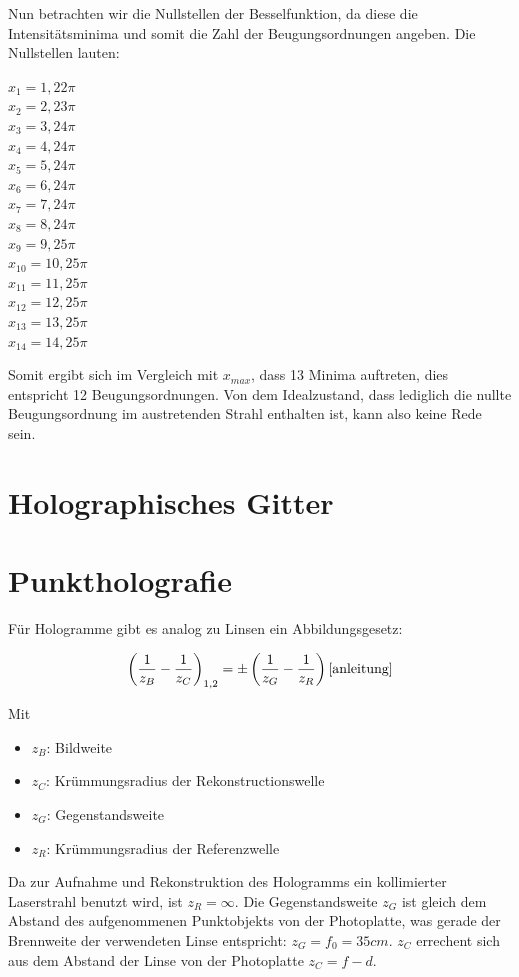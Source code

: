 \documentclass[bigchapter,colorback,accentcolor=tud4b,linedtoc,11pt]{tudreport}
\begin{document}
Nun betrachten wir die Nullstellen der Besselfunktion, da diese die Intensitätsminima und somit die Zahl der Beugungsordnungen angeben. Die Nullstellen lauten: 

\begin{center}
$x_1 = 1,22 \pi$ \\
$x_2 = 2,23 \pi$ \\
$x_3 = 3,24 \pi$ \\
$x_4 = 4,24 \pi$ \\
$x_5 = 5,24 \pi$ \\
$x_6 = 6,24 \pi$ \\
$x_7 = 7,24 \pi$ \\
$x_8 = 8,24 \pi$ \\
$x_9 = 9,25 \pi$ \\
$x_{10} = 10,25 \pi$ \\
$x_{11} = 11,25 \pi$ \\
$x_{12} = 12,25 \pi$ \\
$x_{13} = 13,25 \pi$ \\
$x_{14} = 14,25 \pi$
\end{center}

Somit ergibt sich im Vergleich mit $x_{max}$, dass 13 Minima auftreten, dies entspricht 12 Beugungsordnungen. Von dem Idealzustand, dass lediglich die nullte Beugungsordnung im austretenden Strahl enthalten ist, kann also keine Rede sein.

\section{Holographisches Gitter}

\section{Punktholografie}

Für Hologramme gibt es analog zu Linsen ein Abbildungsgesetz:

$$\left( \frac{1}{z_B} -\frac{1}{z_C} \right)_{1,2} = \pm \left( \frac{1}{z_G}
  -\frac{1}{z_R} \right) \cite{anleitung}$$

Mit 
\begin{itemize}
  \item $z_B$: Bildweite
  \item $z_C$: Krümmungsradius der Rekonstructionswelle
  \item $z_G$: Gegenstandsweite
  \item $z_R$: Krümmungsradius der Referenzwelle
\end{itemize}
Da zur Aufnahme und Rekonstruktion des Hologramms ein kollimierter Laserstrahl
benutzt wird, ist $z_R = \infty$. Die Gegenstandsweite $z_G$ ist gleich dem
Abstand des aufgenommenen Punktobjekts von der Photoplatte, was gerade der
Brennweite der verwendeten Linse entspricht: $z_G = f_0 = 35cm$. $z_C$ errechent
sich aus dem Abstand der Linse von der Photoplatte $z_C = f - d$.
\end{document}
